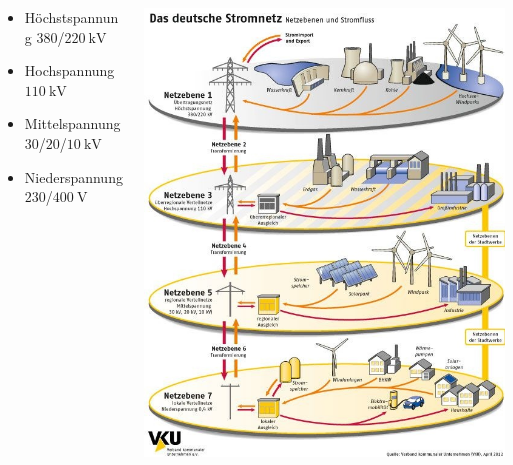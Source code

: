\documentclass[aspectratio=1610, professionalfonts, 9pt]{beamer}
\begin{document}
{
\begin{frame}
  \begin{columns}
  \begin{column}{0.5\textwidth}
\begin{itemize}
  \item Höchstspannung $\num{380}$/$\SI{220}{\kilo\volt}$
  \item Hochspannung  $\SI{110}{\kilo\volt}$
  \item Mittelspannung  $\num{30}$/$\num{20}$/$\SI{10}{\kilo\volt}$
  \item Niederspannung $\num{230}$/$\SI{400}{\volt}$
\end{itemize}
\end{column}
\begin{column}{0.5\textwidth}
\includegraphics[width=1\textwidth]{images/netzebenen.jpg}
\end{column}
\end{columns}
\end{frame}
}
\end{document}
